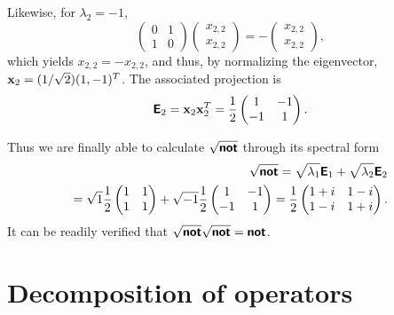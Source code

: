 {Likewise, for $\lambda_2=-1$,
\begin{equation}
\begin{pmatrix}
 0&1\\  1&0
\end{pmatrix}
\begin{pmatrix}
x_{2,2}\\x_{2,2}
\end{pmatrix}
=-\begin{pmatrix}
x_{2,2}\\x_{2,2}
\end{pmatrix}
,
\end{equation}
which yields  $x_{2,2}=-x_{2,2}$, and thus, by normalizing the eigenvector,
${\bf x}_2=(1/\sqrt{2})(1,-1)^T$.
The associated projection is
\begin{equation}
\textsf{\textbf{E}}_2={\bf x}_2{\bf x}_2^T=\frac{1}{2}
\begin{pmatrix}
 1&-1\\  -1&1
\end{pmatrix}
.
\end{equation}

Thus we are finally able to calculate
$\sqrt{\textsf{\textbf{not}}}$
through its spectral form
\begin{equation}
\begin{split}
\sqrt{\textsf{\textbf{not}}}=
\sqrt{\lambda_1}\textsf{\textbf{E}}_1 +
\sqrt{\lambda_2}\textsf{\textbf{E}}_2
\\=  \sqrt{1}
\frac{1}{2} \begin{pmatrix}
 1&1\\  1&1
\end{pmatrix}
+  \sqrt{-1}
\frac{1}{2} \begin{pmatrix}
 1&-1\\  -1&1
\end{pmatrix}
=
\frac{1}{2}
\begin{pmatrix}
 1+i&1-i\\  1-i&1+i
\end{pmatrix}
.
\end{split}
\end{equation}
It can be readily verified that  $\sqrt{\textsf{\textbf{not}}}\sqrt{\textsf{\textbf{not}}}=\textsf{\textbf{not}}$.

\eexample
}

\section{Decomposition of operators}

